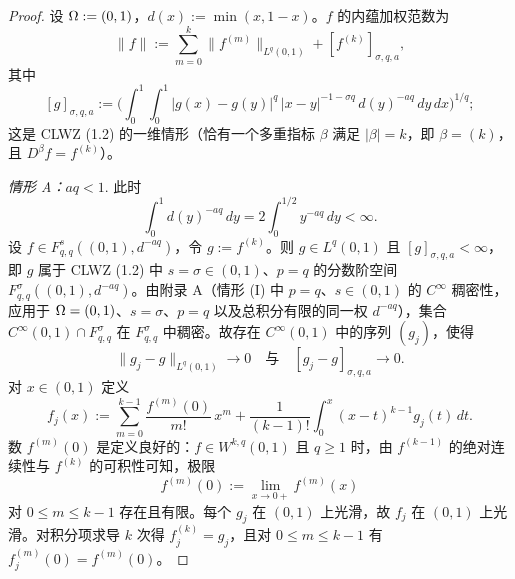 \begin{proof}
设 $\Omega:=(0,1)$，$d(x):=\min(x,1-x)$。$f$ 的内蕴加权范数为
\[
  \|f\|:=\sum_{m=0}^{k}\|f^{(m)}\|_{L^q(0,1)}+[f^{(k)}]_{\sigma,q,a},
\]
其中
\[
  [g]_{\sigma,q,a}:=\Big(\int_0^1\int_0^1|g(x)-g(y)|^q\,|x-y|^{-1-\sigma q}\,d(y)^{-aq}\,dy\,dx\Big)^{1/q};
\]
这是 CLWZ (1.2) 的一维情形（恰有一个多重指标 $\beta$ 满足 $|\beta|=k$，即 $\beta=(k)$，且 $D^\beta f=f^{(k)}$）。

\emph{情形 A：$aq<1$}. 此时
\[
  \int_0^1 d(y)^{-aq}\,dy=2\int_0^{1/2}y^{-aq}\,dy<\infty .
\]
设 $f\in F^s_{q,q}((0,1),d^{-aq})$，令 $g:=f^{(k)}$。则 $g\in L^q(0,1)$ 且 $[g]_{\sigma,q,a}<\infty$，即 $g$ 属于 CLWZ (1.2) 中 $s=\sigma\in(0,1)$、$p=q$ 的分数阶空间 $F^\sigma_{q,q}((0,1),d^{-aq})$。由附录 A（情形 (I) 中 $p=q$、$s\in(0,1)$ 的 $C^\infty$ 稠密性，应用于 $\Omega=(0,1)$、$s=\sigma$、$p=q$ 以及总积分有限的同一权 $d^{-aq}$），集合 $C^\infty(0,1)\cap F^\sigma_{q,q}$ 在 $F^\sigma_{q,q}$ 中稠密。故存在 $C^\infty(0,1)$ 中的序列 $(g_j)$，使得
\begin{equation}
  \|g_j-g\|_{L^q(0,1)}\to0
  \quad\text{与}\quad
  [g_j-g]_{\sigma,q,a}\to0 .
  \tag{3.11}
\end{equation}
对 $x\in(0,1)$ 定义
\[
  f_j(x):=\sum_{m=0}^{k-1}\frac{f^{(m)}(0)}{m!}\,x^m
  +\frac{1}{(k-1)!}\int_0^x (x-t)^{k-1}g_j(t)\,dt .
\]
数 $f^{(m)}(0)$ 是定义良好的：$f\in W^{k,q}(0,1)$ 且 $q\ge1$ 时，由 $f^{(k-1)}$ 的绝对连续性与 $f^{(k)}$ 的可积性可知，极限
\[
  f^{(m)}(0):=\lim_{x\to0+}f^{(m)}(x)
\]
对 $0\le m\le k-1$ 存在且有限。每个 $g_j$ 在 $(0,1)$ 上光滑，故 $f_j$ 在 $(0,1)$ 上光滑。对积分项求导 $k$ 次得 $f_j^{(k)}=g_j$，且对 $0\le m\le k-1$ 有 $f_j^{(m)}(0)=f^{(m)}(0)$。


\end{proof}
